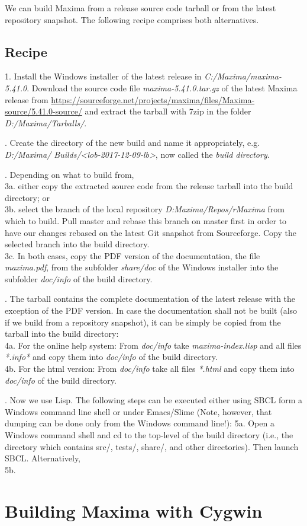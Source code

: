 \documentclass[../Maxima_Workbook.tex]{subfiles}
\begin{document}
\lz We can build Maxima from a release source code tarball or from the latest repository snapshot. The following recipe comprises both alternatives.

\subsection{Recipe}

1. Install the Windows installer of the latest release in \emph{C:/Maxima/maxima-5.41.0}. Download the source code file \emph{maxima-5.41.0.tar.gz} of the latest Maxima release from \href{https://sourceforge.net/projects/maxima/files/Maxima-source/5.41.0-source/}{https://sourceforge.net/projects/maxima/files/Maxima-source/5.41.0-source/} and extract the tarball with 7zip in the folder \emph{D:/Maxima/Tarballs/}.

. Create the directory of the new build and name it appropriately, e.g. \emph{D:/Maxima/ Builds/<lob-2017-12-09-lb>}, now called the \emph{build directory}.

. Depending on what to build from, \\
3a. either copy the extracted source code from the release tarball into the build directory; or \\
3b. select the branch of the local repository \emph{D:Maxima/Repos/rMaxima} from which to build. Pull master and rebase this branch on master first in order to have our changes rebased on the latest Git snapshot from Sourceforge. Copy the selected branch into the build directory. \\
3c. In both cases, copy the PDF version of the documentation, the file \emph{maxima.pdf}, from the subfolder \emph{share/doc} of the Windows installer into the subfolder \emph{doc/info} of the build directory.

. The tarball contains the complete documentation of the latest release with the exception of the PDF version. In case the documentation shall not be built (also if we build from a repository snapshot), it can be simply be copied from the tarball into the build directory: \\
4a. For the online help system: From \emph{doc/info} take \emph{maxima-index.lisp} and all files \emph{*.info*} and copy them into \emph{doc/info} of the build directory. \\
4b. For the html version: From \emph{doc/info} take all files \emph{*.html} and copy them into \emph{doc/info} of the build directory.

. Now we use Lisp. The following steps can be executed either using SBCL form a Windows command line shell or under Emacs/Slime (Note, however, that dumping can be done only from the Windows command line!):
5a. Open a Windows command shell and cd to the top-level of the build directory (i.e., the directory which contains src/, tests/, share/, and other directories). Then launch SBCL. Alternatively, \\
5b. 

\section{Building Maxima with Cygwin}
\end{document}
